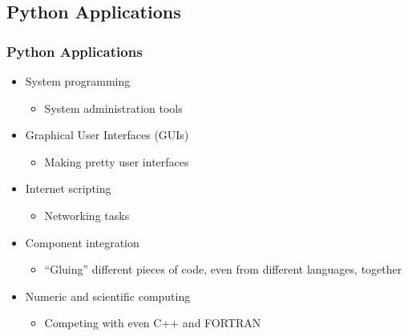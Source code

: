 \documentclass[mini frame in current subsection]{beamer}
\begin{document}
	
	\subsection{Python Applications}
	
		\begin{frame}
			\frametitle{Python Applications}
			\begin{itemize}
				\vfill \item  System programming
					\begin{itemize}
						\item  System administration tools
					\end{itemize}
				\vfill \item  Graphical User Interfaces (GUIs)
					\begin{itemize}
						\item  Making pretty user interfaces
					\end{itemize}
				\vfill \item  Internet scripting
					\begin{itemize}
						\item  Networking tasks
					\end{itemize}
				\vfill \item  Component integration
					\begin{itemize}
						\item  ``Gluing'' different pieces of code, even from different languages, together
					\end{itemize}
				\vfill \item  Numeric and scientific computing
					\begin{itemize}
						\item  Competing with even C++ and FORTRAN
					\end{itemize}
			\end{itemize}
		\end{frame}
	
\end{document}
